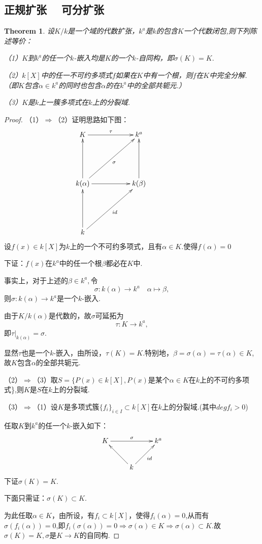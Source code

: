 \documentclass[UTF8]{article}
\newtheorem{thm}{Theorem}[section]
\begin{document}
\subsection{正规扩张$\quad$ 可分扩张}
\normalsize

\begin{thm}
设$K/k$是一个域的代数扩张，$k^a$是$k$的包含$K$一个代数闭包,则下列陈述等价：

（1）$K$到$k^a$的任一个$k$-嵌入均是$K$的一个$k$-自同构，即$\sigma(K)=K.$

（2）$k[X]$中的任一不可约多项式$f$如果在$K$中有一个根，则$f$在$K$中完全分解.（即$K$包含$\alpha\in k^a$的同时也包含$\alpha$的在$k^a$中的全部共轭元.）

（3）$K$是$k$上一簇多项式在$k$上的分裂域.
\end{thm}
\begin{proof}
（1）$\Longrightarrow$（2）证明思路如下图：
$$\xymatrix{K\ar[rr]^{\tau}&&{k^a}\\ \\ k(\alpha)\ar[uu]\ar[rruu]_{\sigma}\ar[rr]&&{k(\beta)}\ar[uu]&&\\ \\k\ar[uu]\ar[rruu]_{id}&&}$$
设$f(x)\in k[X]$为$k$上的一个不可约多项式，且有$\alpha\in K.$使得$f(\alpha)=0$

下证：$f(x)$在$k^a$中的任一个根$\beta$都必在$K$中.

事实上，对于上述的$\beta\in k^a,$令$$\sigma:k(\alpha)\rightarrow k^a \quad \alpha\longmapsto \beta,$$则$\sigma:k(\alpha)\rightarrow k^a$是一个$k$-嵌入.

由于$K/k(\alpha)$是代数的，故$\sigma$可延拓为$$\tau:K\rightarrow k^a,$$即$\tau|_{k(\alpha)}=\sigma.$

显然$\tau$也是一个$k$-嵌入，由所设，$\tau(K)=K.$特别地，$\beta=\sigma(\alpha)=\tau(\alpha)\in K$,故$K$包含$\alpha$的全部共轭元.

（2）$\Longrightarrow$（3）取$S=\{P(x)\in k[X],P(x)$是某个$\alpha\in K$在$k$上的不可约多项式\},则$K$是$S$在$k$上的分裂域.

（3）$\Longrightarrow$（1）设$K$是多项式簇$\{f_i\}_{i\in I}\subset k[X]$在$k$上的分裂域.(其中$degf_i>0$)

任取$K$到$k^a$的任一个$k$-嵌入如下：$$\xymatrix{K\ar[rr]^{\sigma}&&{k^a}\\& k\ar[lu] \ar[ru]_{id} & }$$下证$\sigma(K)=K.$

下面只需证：$\sigma(K)\subset K.$

为此任取$\alpha\in K$，由所设，有$f_i\subset k[X]$，使得$f_i(\alpha)=0$,从而有$\sigma(f_i(\alpha))=0$,即$f_i(\sigma(\alpha))=0\Rightarrow \sigma(\alpha)\in K \Rightarrow\sigma(\alpha)\subset K$.故$\sigma(K)=K,\sigma$是$K\rightarrow K$的自同构.
\end{proof}
\end{document}
